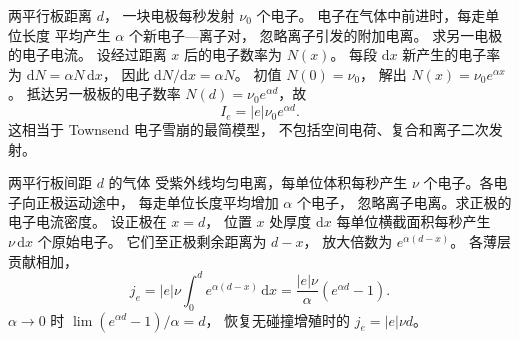 两平行板距离 $d$，
一块电极每秒发射
$\nu_0$ 个电子。
电子在气体中前进时，每走单位长度
平均产生 $\alpha$ 个新电子—离子对，
忽略离子引发的附加电离。
求另一电极的电子电流。
\exsolution
设经过距离 $x$ 后的电子数率为 $N(x)$。
每段 $\mathrm dx$ 新产生的电子率为
$\mathrm dN=\alpha N\,\mathrm dx$，
因此
$\mathrm dN/\mathrm dx=\alpha N$。
初值 $N(0)=\nu_0$，
解出
$N(x)=\nu_0e^{\alpha x}$。
抵达另一极板的电子数率
$N(d)=\nu_0e^{\alpha d}$，故
\[
\boxed{I_e=|e|\nu_0e^{\alpha d}}.
\]
\excheck 这相当于 Townsend
电子雪崩的最简模型，
不包括空间电荷、复合和离子二次发射。

两平行板间距 $d$ 的气体
受紫外线均匀电离，每单位体积每秒产生
$\nu$ 个电子。各电子向正极运动途中，
每走单位长度平均增加 $\alpha$ 个电子，
忽略离子电离。求正极的电子电流密度。
\exsolution
设正极在 $x=d$，
位置 $x$ 处厚度 $\mathrm dx$
每单位横截面积每秒产生
$\nu\,\mathrm dx$ 个原始电子。
它们至正极剩余距离为 $d-x$，
放大倍数为
$e^{\alpha(d-x)}$。
各薄层贡献相加，
\[
j_e=|e|\nu\int_0^d
e^{\alpha(d-x)}\,\mathrm dx
=\boxed{\frac{|e|\nu}{\alpha}
(e^{\alpha d}-1)}.
\]
\excheck $\alpha\to0$ 时
$\lim(e^{\alpha d}-1)/\alpha=d$，
恢复无碰撞增殖时的
$j_e=|e|\nu d$。
